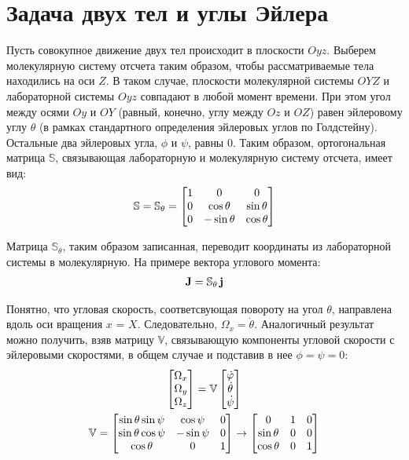 \documentclass[12pt]{article}
\newcommand{\bbS}{\mathbb{S}}
\newcommand{\bbV}{\mathbb{V}}
\newcommand{\mf}{\mathbf}
\begin{document}
\section{Задача двух тел и углы Эйлера}

Пусть совокупное движение двух тел происходит в плоскости $Oyz$. Выберем молекулярную систему отсчета таким образом, чтобы рассматриваемые тела находились на оси $Z$. В таком случае, плоскости молекулярной системы $OYZ$ и лабораторной системы $Oyz$ совпадают в любой момент времени. При этом угол между осями $Oy$ и $OY$ (равный, конечно, углу между $Oz$ и $OZ$) равен эйлеровому углу $\theta$ (в рамках стандартного определения эйлеровых углов по Голдстейну). Остальные два эйлеровых угла, $\phi$ и $\psi$, равны 0. Таким образом, ортогональная матрица $\bbS$, связывающая лабораторную и молекулярную систему отсчета, имеет вид:
\begin{gather}
	\bbS = \bbS_\theta = 
	\begin{bmatrix}
		1 & 0 & 0 \\
		0 & \cos \theta & \sin \theta \\
		0 & - \sin \theta & \cos \theta
	\end{bmatrix} \notag
\end{gather} 

Матрица $\bbS_\theta$, таким образом записанная, переводит координаты из лабораторной системы в молекулярную. На примере вектора углового момента:
\begin{gather}
		\mf{J} = \bbS_\theta \, \mf{j} \notag
\end{gather}

Понятно, что угловая скорость, соответсвующая повороту на угол $\theta$, направлена вдоль оси вращения $x$ = $X$. Следовательно, $\Omega_x = \dot{\theta}$. Аналогичный результат можно получить, взяв матрицу $\bbV$, связывающую компоненты угловой скорости с эйлеровыми скоростями, в общем случае и подставив в нее $\phi = \psi = 0$:
\begin{gather}
	\begin{bmatrix}
	\Omega_x \\
	\Omega_y \\
	\Omega_z 
	\end{bmatrix} = \bbV 
	\begin{bmatrix}
		\dot{\varphi} \\
		\dot{\theta} \\
		\dot{\psi}
	\end{bmatrix} \notag \\
	\bbV = \begin{bmatrix}
		\sin \theta \sin \psi & \cos \psi & 0 \\
		\sin \theta \cos \psi & - \sin \psi & 0 \\
		\cos \theta & 0 & 1
	\end{bmatrix} \rightarrow
	\begin{bmatrix}
		0 & 1 & 0 \\
		\sin \theta & 0 & 0 \\
		\cos \theta & 0 & 1
	\end{bmatrix} \notag
\end{gather}
\end{document}
